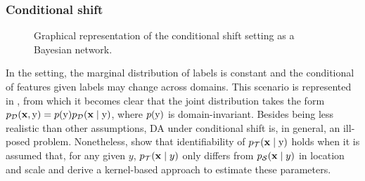\subsubsection{Conditional shift}
\label{sec:cond_shift_sota}
\begin{figure}
    \centering
    \caption{Graphical representation of the conditional shift setting as a Bayesian network.}
    \label{fig:cond_shift}
\end{figure}
In the  setting, the marginal distribution of labels is constant and the conditional of features given labels may change across domains. This scenario is represented in , from which it becomes clear that the joint distribution takes the form $p_{{\mathcal{D}}}({\mathbf{x}}, {\textnormal{y}}) = p({\textnormal{y}}) p_{{\mathcal{D}}}({\mathbf{x}} \mid {\textnormal{y}})$, where $p({\textnormal{y}})$ is domain-invariant. Besides being less realistic than other assumptions, DA under conditional shift is, in general, an ill-posed problem. Nonetheless, \citet{Zhang2013} show that identifiability of $p_{{\mathcal{T}}}({\mathbf{x}} \mid {\textnormal{y}})$ holds when it is assumed that, for any given $y$, $p_{{\mathcal{T}}}({\mathbf{x}} \mid y)$ only differs from $p_{{\mathcal{S}}}({\mathbf{x}} \mid y)$ in location and scale and derive a kernel-based approach to estimate these parameters.

